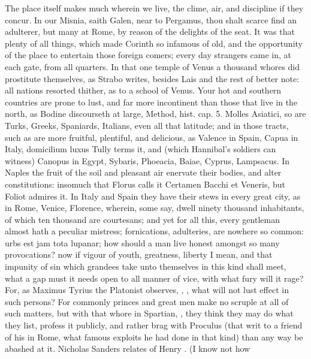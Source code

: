The place itself makes much wherein we live, the clime, air, and
discipline if they concur. In our Misnia, saith Galen, near to
Pergamus, thou shalt scarce find an adulterer, but many at Rome, by
reason of the delights of the seat. It was that plenty of all things,
which made Corinth so infamous of old, and the opportunity of the
place to entertain those foreign comers; every day strangers came in,
at each gate, from all quarters. In that one temple of Venus a thousand
whores did prostitute themselves, as Strabo writes, besides Lais and
the rest of better note: all nations resorted thither, as to a school
of Venus. Your hot and southern countries are prone to lust, and far
more incontinent than those that live in the north, as Bodine
discourseth at large, Method, hist. cap. 5. Molles Asiatici, so are
Turks, Greeks, Spaniards, Italians, even all that latitude; and in
those tracts, such as are more fruitful, plentiful, and delicious, as
Valence in Spain, Capua in Italy, domicilium luxus Tully terms it, and
(which Hannibal's soldiers can witness) Canopus in Egypt, Sybaris,
Phoeacia, Baiae, Cyprus, Lampsacus. In Naples the fruit of
the soil and pleasant air enervate their bodies, and alter
constitutions: insomuch that Florus calls it Certamen Bacchi et
Veneris, but Foliot admires it. In Italy and Spain they have
their stews in every great city, as in Rome, Venice, Florence, wherein,
some say, dwell ninety thousand inhabitants, of which ten thousand are
courtesans; and yet for all this, every gentleman almost hath a
peculiar mistress; fornications, adulteries, are nowhere so common:
urbs est jam tota lupanar; how should a man live honest amongst so many
provocations? now if vigour of youth, greatness, liberty I mean, and
that impunity of sin which grandees take unto themselves in this kind
shall meet, what a gap must it needs open to all manner of vice, with
what fury will it rage? For, as Maximus Tyrius the Platonist observes,
, \etc{}, what will not lust effect in
such persons? For commonly princes and great men make no scruple at all
of such matters, but with that whore in Spartian, ,
they think they may do what they list, profess it publicly, and rather
brag with Proculus (that writ to a friend of his in Rome, what
famous exploits he had done in that kind) than any way be abashed at
it. Nicholas Sanders relates of Henry . (I know not how

